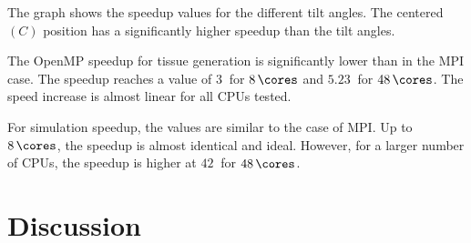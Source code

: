 The graph shows the speedup values for the different tilt angles.
The centered $(C)$ position has a significantly higher speedup than the tilt angles.
\par
%
The \ac{OpenMP} speedup for tissue generation is significantly lower than in the \ac{MPI} case.
The speedup reaches a value of $\SI{3}{}$ for $\SI{8}{\cores}$ and $\SI{5.23}{}$ for $\SI{48}{\cores}$.
The speed increase is almost linear for all \acp{CPU} tested.
\par
%
For simulation speedup, the values are similar to the case of \ac{MPI}.
Up to $\SI{8}{\cores}$, the speedup is almost identical and ideal.
However, for a larger number of \acsp{CPU}, the speedup is higher at $\SI{42}{}$ for $\SI{48}{\cores}$.
%
% 
%
\section{Discussion}
%
